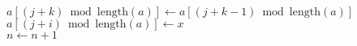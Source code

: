 \documentclass{beamer}
\begin{document}
\begin{frame}
\begin{oframed}
\begin{flushleft}
\hspace*{1em} \hspace*{1em} \hspace*{1em} \hspace*{1em} $\ensuremath{\ensuremath{\mathit{a}}[\ensuremath{(\ensuremath{\mathit{j}}+\ensuremath{\mathit{k}})\bmod \mathrm{length}(\ensuremath{\mathit{a}})}] \gets  \ensuremath{\ensuremath{\mathit{a}}[(\ensuremath{\mathit{j}}+\ensuremath{\mathit{k}}-1)\bmod \mathrm{length}(\ensuremath{\mathit{a}})]}}$\\
\hspace*{1em} \hspace*{1em} $\ensuremath{\ensuremath{\mathit{a}}[\ensuremath{(\ensuremath{\mathit{j}}+\ensuremath{\mathit{i}})\bmod \mathrm{length}(\ensuremath{\mathit{a}})}] \gets  \ensuremath{x}}$\\
\hspace*{1em} \hspace*{1em} $\ensuremath{\ensuremath{\mathit{n}} \gets  \ensuremath{\ensuremath{\mathit{n}} + 1}}$\\
\end{flushleft}
\end{oframed}
\end{frame}
\end{document}

